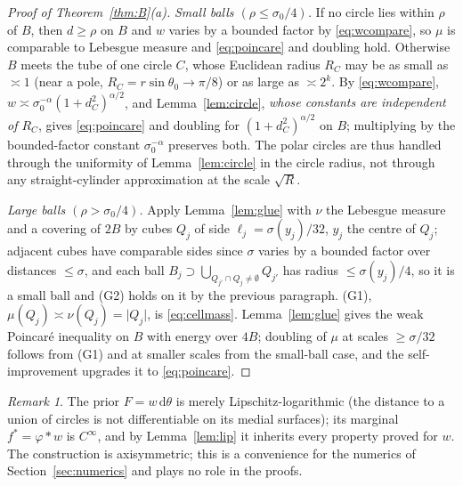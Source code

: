 \documentclass[11pt]{amsart}
\newcommand{\dd}{\,\mathrm{d}}
\newcommand{\abs}[1]{\lvert #1\rvert}
\theoremstyle{plain}
\theoremstyle{definition}
\theoremstyle{remark}
\newtheorem{remark}[theorem]{Remark}
\begin{document}
\begin{proof}[Proof of Theorem~\ref{thm:B}(a)]
\emph{Small balls $(\rho\le\sigma_0/4)$.} If no circle lies within $\rho$ of $B$,
then $d\ge\rho$ on $B$ and $w$ varies by a bounded factor by \eqref{eq:wcompare},
so $\mu$ is comparable to Lebesgue measure and \eqref{eq:poincare} and doubling
hold. Otherwise $B$ meets the tube of one circle $C$, whose Euclidean radius
$R_C$ may be as small as $\asymp1$ (near a pole, $R_C=r\sin\theta_0\to\pi/8$) or
as large as $\asymp2^k$. By \eqref{eq:wcompare}, $w\asymp\sigma_0^{-\alpha}
(1+d_C^2)^{\alpha/2}$, and Lemma~\ref{lem:circle}, \emph{whose constants are
independent of $R_C$}, gives \eqref{eq:poincare} and doubling for
$(1+d_C^2)^{\alpha/2}$ on $B$; multiplying by the bounded-factor constant
$\sigma_0^{-\alpha}$ preserves both. The polar circles are thus handled through
the uniformity of Lemma~\ref{lem:circle} in the circle radius, not through any
straight-cylinder approximation at the scale $\sqrt R$.

\emph{Large balls $(\rho>\sigma_0/4)$.} Apply Lemma~\ref{lem:glue} with $\nu$ the
Lebesgue measure and a covering of $2B$ by cubes $Q_j$ of side
$\ell_j=\sigma(y_j)/32$, $y_j$ the centre of $Q_j$; adjacent cubes have
comparable sides since $\sigma$ varies by a bounded factor over distances
$\le\sigma$, and each ball $B_j\supset\bigcup_{Q_{j'}\cap Q_j\ne\emptyset}Q_{j'}$
has radius $\le\sigma(y_j)/4$, so it is a small ball and (G2) holds on it by the
previous paragraph. (G1), $\mu(Q_j)\asymp\nu(Q_j)=\abs{Q_j}$, is
\eqref{eq:cellmass}. Lemma~\ref{lem:glue} gives the weak Poincar\'e inequality on
$B$ with energy over $4B$; doubling of $\mu$ at scales $\ge\sigma/32$ follows
from (G1) and at smaller scales from the small-ball case, and the
self-improvement \cite[Thms.~5.1, 9.7]{hajlaszkoskela2000} upgrades it to
\eqref{eq:poincare}.
\end{proof}

\begin{remark}
The prior $F=w\dd\theta$ is merely Lipschitz-logarithmic (the distance to a
union of circles is not differentiable on its medial surfaces); its marginal
$f^*=\varphi*w$ is $C^\infty$, and by Lemma~\ref{lem:lip} it inherits every
property proved for $w$. The construction is axisymmetric; this is a
convenience for the numerics of Section~\ref{sec:numerics} and plays no role in
the proofs.
\end{remark}
\end{document}
